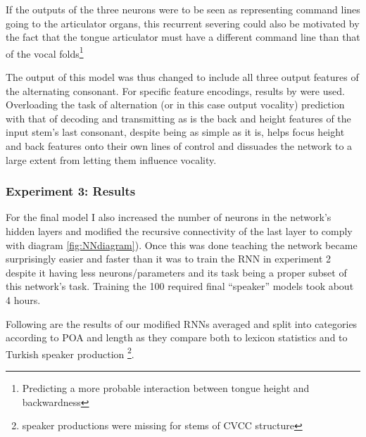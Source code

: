 \documentclass[a4paper,12pt]{article}
\begin{document}
If the outputs of the three neurons were to be seen as representing command lines going to the
articulator organs, this recurrent severing could also be motivated by the fact that the tongue
articulator must have a different command line than that of the vocal folds\footnote{Predicting
a more probable interaction between tongue height and backwardness}

The output of this model was thus changed to include all three output features of the alternating
consonant. For specific feature encodings, results by \cite{stachowski_phonological_2015} were used.
Overloading the task of alternation (or in this case output vocality) prediction with that of
decoding and transmitting as is the back and height features of the input stem's last consonant,
despite being as simple as it is, helps focus height and back features onto their own lines of
control and dissuades the network to a large extent from letting them influence vocality.

\subsubsection{Experiment 3: Results}

For the final model I also increased the number of neurons in the network's hidden layers and
modified the recursive connectivity of the last layer to comply with diagram \ref{fig:NNdiagram}).
Once this was done teaching the network became surprisingly easier and faster than it was to train
the RNN in experiment 2 despite it having less neurons/parameters and its task being a proper subset
of this network's task. Training the 100 required final ``speaker'' models took about 4 hours.

Following are the results of our modified RNNs averaged and split into categories according to
POA and length as they compare both to lexicon statistics and to Turkish speaker production
\footnote{speaker productions were missing for stems of CVCC structure}.
\end{document}
